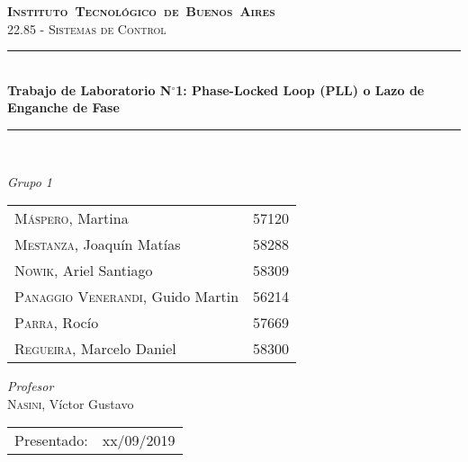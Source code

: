 \begin{titlepage}
\newcommand{\HRule}{\rule{\linewidth}{0.5mm}}
\center
\mbox{\textsc{\LARGE \bfseries {Instituto Tecnol\'ogico de Buenos Aires}}}\\[1.5cm]
\textsc{\Large 22.85 - Sistemas de Control}\\[0.5cm]


\HRule \\[0.6cm]
{ \Huge \bfseries Trabajo de Laboratorio N$^{\circ}$1: Phase-Locked Loop (PLL) o Lazo de Enganche de Fase}\\[0.4cm] %
\HRule \\[1.5cm]


{\large

\emph{Grupo 1}\\
\vspace{3px}

\begin{tabular}{lr} 	
\textsc{M\'aspero}, Martina  & 57120 \\
\textsc{Mestanza}, Joaqu\'in Mat\'ias  & 58288 \\
\textsc{Nowik}, Ariel Santiago  & 58309 \\
\textsc{Panaggio Venerandi}, Guido Martin  & 56214 \\
\textsc{Parra}, Roc\'io  & 57669 \\
\textsc{Regueira}, Marcelo Daniel  & 58300 \\

\end{tabular}

\vspace{20px}

\emph{Profesor}\\
\vspace{3px}
\textsc{Nasini}, V\'ictor Gustavo\\ 	
\vspace{100px}

\begin{tabular}{ll}

Presentado: & xx/09/2019\\

\end{tabular}

}

\vfill

\end{titlepage}